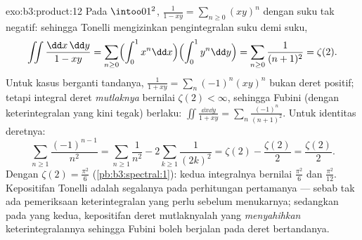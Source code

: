 \begin{solution}{exo:b3:product:12}
Pada $\intoo01^2$, $\frac1{1 - xy} = \sum_{n\geq0}(xy)^n$ dengan
suku tak negatif: sehingga Tonelli mengizinkan pengintegralan suku demi suku,
\[
\iint\frac{\dd x\,\dd y}{1 - xy}
= \sum_{n\geq0}\Bigl(\int_0^1x^n\dd x\Bigr)
\Bigl(\int_0^1y^n\dd y\Bigr)
= \sum_{n\geq0}\frac1{(n+1)^2} = \zeta(2) .
\]
Untuk kasus berganti tandanya, $\frac1{1 + xy} =
\sum_n(-1)^n(xy)^n$ bukan deret positif; tetapi
integral deret \emph{mutlaknya} bernilai $\zeta(2) <
\infty$, sehingga Fubini (dengan keterintegralan yang kini tegak) berlaku:
$\iint\frac{\dd x\dd y}{1 + xy} =
\sum_n\frac{(-1)^n}{(n+1)^2}$. Untuk identitas deretnya:
\[
\sum_{n\geq1}\frac{(-1)^{n-1}}{n^2}
= \sum_{n\geq1}\frac1{n^2} - 2\sum_{k\geq1}\frac1{(2k)^2}
= \zeta(2) - \frac{\zeta(2)}2 = \frac{\zeta(2)}2 .
\]
Dengan $\zeta(2) = \frac{\pi^2}6$ (\cref{pb:b3:spectral:1}):
kedua integralnya bernilai $\frac{\pi^2}6$ dan $\frac{\pi^2}{12}$.
Kepositifan Tonelli adalah segalanya pada perhitungan
pertamanya --- sebab tak ada pemeriksaan keterintegralan yang perlu sebelum
menukarnya; sedangkan pada yang kedua, kepositifan deret
mutlaknyalah yang \emph{menyahihkan} keterintegralannya sehingga
Fubini boleh berjalan pada deret bertandanya.
\end{solution}

